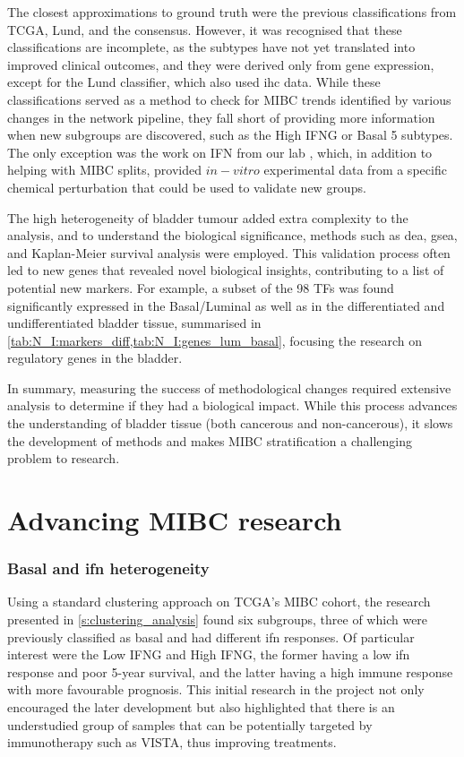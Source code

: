 The closest approximations to ground truth were the previous classifications from TCGA, Lund, and the consensus. However, it was recognised that these classifications are incomplete, as the subtypes have not yet translated into improved clinical outcomes, and they were derived only from gene expression, except for the Lund classifier, which also used \acrlong{ihc} data. While these classifications served as a method to check for MIBC trends identified by various changes in the network pipeline, they fall short of providing more information when new subgroups are discovered, such as the High IFNG or Basal 5 subtypes. The only exception was the work on \gls{IFN} from our lab \citep{Baker2022-bj}, which, in addition to helping with MIBC splits, provided
$in-vitro$ experimental data from a specific chemical perturbation that could be used to validate new groups.

The high heterogeneity of bladder tumour added extra complexity to the analysis, and to understand the biological significance, methods such as \acrlong{dea}, \acrlong{gsea}, and Kaplan-Meier survival analysis were employed. This validation process often led to new genes that revealed novel biological insights, contributing to a list of potential new markers. For example, a subset of the 98 TFs was found significantly expressed in the Basal/Luminal as well as in the differentiated and undifferentiated bladder tissue, summarised in \cref{tab:N_I:markers_diff,tab:N_I:genes_lum_basal}, focusing the research on regulatory genes in the bladder.


In summary, measuring the success of methodological changes required extensive analysis to determine if they had a biological impact. While this process advances the understanding of bladder tissue (both cancerous and non-cancerous), it slows the development of methods and makes MIBC stratification a challenging problem to research.

\section{Advancing MIBC research}

\subsubsection*{Basal and \acrlong{ifn} heterogeneity}

Using a standard clustering approach on TCGA's MIBC cohort, the research presented in \cref{s:clustering_analysis} found six subgroups, three of which were previously classified as basal and had different \acrshort{ifn} responses. Of particular interest were the Low IFNG and High IFNG, the former having a low \acrshort{ifn} response and poor 5-year survival, and the latter having a high immune response with more favourable prognosis. This initial research in the project not only encouraged the later development but also highlighted that there is an understudied group of samples that can be potentially targeted by immunotherapy such as VISTA\citep{Baker2022-bj}, thus improving treatments.


